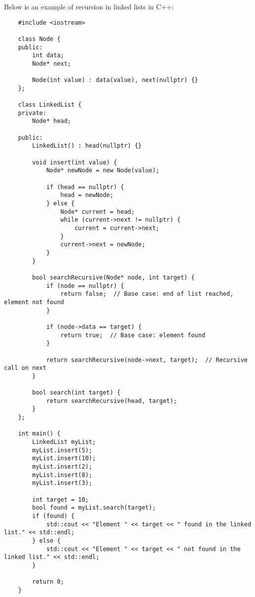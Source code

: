 \begin{solution}
    Below is an example of recursion in linked lists in C++:

    \horizontalline

    \begin{verbatim}
    #include <iostream>

    class Node {
    public:
        int data;
        Node* next;
    
        Node(int value) : data(value), next(nullptr) {}
    };
    
    class LinkedList {
    private:
        Node* head;
    
    public:
        LinkedList() : head(nullptr) {}
    
        void insert(int value) {
            Node* newNode = new Node(value);
    
            if (head == nullptr) {
                head = newNode;
            } else {
                Node* current = head;
                while (current->next != nullptr) {
                    current = current->next;
                }
                current->next = newNode;
            }
        }
    
        bool searchRecursive(Node* node, int target) {
            if (node == nullptr) {
                return false;  // Base case: end of list reached, element not found
            }
    
            if (node->data == target) {
                return true;  // Base case: element found
            }
    
            return searchRecursive(node->next, target);  // Recursive call on next
        }
    
        bool search(int target) {
            return searchRecursive(head, target);
        }
    };
    
    int main() {
        LinkedList myList;
        myList.insert(5);
        myList.insert(10);
        myList.insert(2);
        myList.insert(8);
        myList.insert(3);
    
        int target = 10;
        bool found = myList.search(target);
        if (found) {
            std::cout << "Element " << target << " found in the linked list." << std::endl;
        } else {
            std::cout << "Element " << target << " not found in the linked list." << std::endl;
        }
    
        return 0;
    }
    \end{verbatim}


\end{solution}

